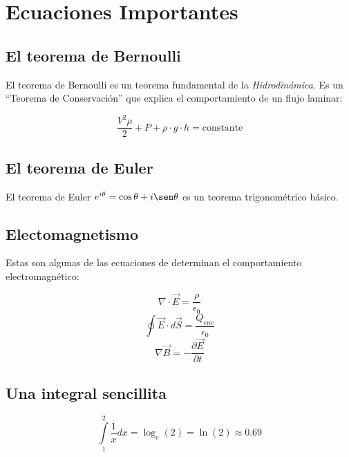 \documentclass[a4paper,10pt]{article}
\title{}
\author{}
\date{}
\begin{document}
\section{Ecuaciones Importantes}

\subsection{El teorema de Bernoulli}
El teorema de Bernoulli es un teorema fundamental de la \textit{Hidrodinámica}. Es un ``Teorema de Conservación'' que
explica el comportamiento de un flujo laminar:

\begin{equation}
\frac{V^2 \rho}{2}+P+\rho\cdot g \cdot h=\mathrm{constante}
\end{equation}

\subsection{El teorema de Euler}

El teorema de Euler $e^{i \theta}=\cos\theta+i \sen\theta$ es un teorema trigonométrico básico.

\subsection{Electomagnetismo}

Estas son algunas de las ecuaciones de determinan el comportamiento electromagnético:

$$\nabla\cdot \vec{E}=\frac{\rho}{\epsilon_0} $$
$$\oint \vec{E} \cdot d\vec{S}=\frac{Q_{enc}}{\epsilon_0} $$
$$\nabla \vec{B}=-\frac{\partial \vec{E}}{\partial t}$$

\subsection{Una integral sencillita}

\begin{equation}
\int\limits_1^2 \frac{1}{x} dx=\log_e(2)=\ln(2)\approx 0.69
\end{equation}
\end{document}
